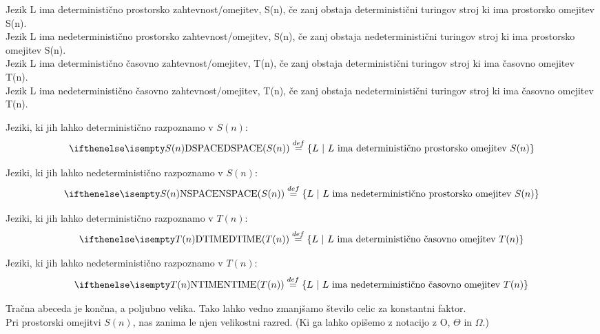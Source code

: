 \documentclass[10pt,a4paper,oneside]{book}
\begin{document}
\begin{neurejeno}
Jezik L ima deterministično prostorsko zahtevnost/omejitev, S(n), če zanj obstaja deterministični turingov stroj ki ima prostorsko omejitev S(n).\\
Jezik L ima nedeterministično prostorsko zahtevnost/omejitev, S(n), če zanj obstaja nedeterministični turingov stroj ki ima prostorsko omejitev S(n).\\
Jezik L ima deterministično časovno zahtevnost/omejitev, T(n), če zanj obstaja deterministični turingov stroj ki ima časovno omejitev T(n).\\
Jezik L ima nedeterministično časovno zahtevnost/omejitev, T(n), če zanj obstaja nedeterministični turingov stroj ki ima časovno omejitev T(n).
\br
{}
\begin{items}
\item Jeziki, ki jih lahko deterministično razpoznamo v $S(n)$:
\[ \DSPACE{S(n)} \PoDef \{ L \| L \mbox{ ima deterministično prostorsko omejitev } S(n) \} \]
\item Jeziki, ki jih lahko nedeterministično razpoznamo v $S(n)$:
\[ \NSPACE{S(n)} \PoDef \{ L \| L \mbox{ ima nedeterministično prostorsko omejitev } S(n) \} \]
\item Jeziki, ki jih lahko deterministično razpoznamo v $T(n)$:
\[ \DTIME{T(n)} \PoDef \{ L \| L \mbox{ ima deterministično časovno omejitev } T(n) \} \]
\item Jeziki, ki jih lahko nedeterministično razpoznamo v $T(n)$:
\[ \NTIME{T(n)} \PoDef \{ L \| L \mbox{ ima nedeterministično časovno omejitev } T(n) \} \]
\end{items}
Tračna abeceda je končna, a poljubno velika.
Tako lahko vedno zmanjšamo število celic za konstantni faktor.\\%
Pri prostorski omejitvi $S(n)$, nas zanima le njen velikostni razred. (Ki ga lahko opišemo z notacijo z O, $\Theta$ in $\Omega$.)


\end{neurejeno}
\end{document}
